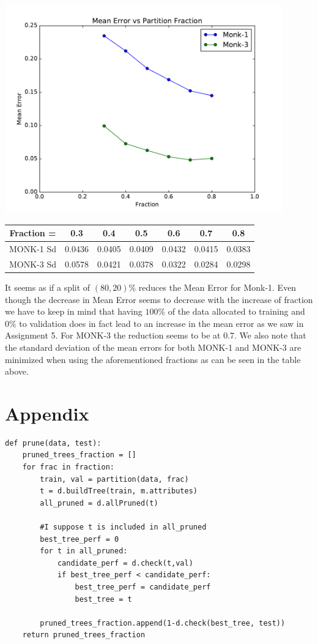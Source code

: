 \documentclass{article}
\begin{document}
\includegraphics[width = 12cm]{figure_1.pdf}

\begin{center}
 \begin{tabular}{|c c c c c c c|} 
 \hline
 Fraction = & 0.3 & 0.4 & 0.5 & 0.6 & 0.7 & 0.8  \\ [0.5ex] 
 \hline 
 MONK-1 Sd \vline & 0.0436 & 0.0405 & 0.0409 & 0.0432 & 0.0415 & 0.0383 \\ 
 \hline
 MONK-3 Sd  \vline & 0.0578 & 0.0421 & 0.0378 & 0.0322 & 0.0284 & 0.0298 \\ [1ex] 
 \hline
\end{tabular}

\end{center}

It seems as if a split of $(80,20)\%$ reduces the Mean Error for Monk-1. Even though the decrease in Mean Error seems to decrease with the increase of fraction we have to keep in mind that having $100\%$ of the data allocated to training and $0\%$ to validation does in fact lead to an increase in the mean error as we saw in Assignment 5. For MONK-3 the reduction seems to be at $0.7$. We also note that the standard deviation of the mean errors for both MONK-1 and MONK-3 are minimized when using the aforementioned fractions as can be seen in the table above.

\section*{Appendix}

\begin{lstlisting}
def prune(data, test):
	pruned_trees_fraction = []
	for frac in fraction:
		train, val = partition(data, frac)
		t = d.buildTree(train, m.attributes)
		all_pruned = d.allPruned(t)
		
		#I suppose t is included in all_pruned
		best_tree_perf = 0
		for t in all_pruned:
			candidate_perf = d.check(t,val)
			if best_tree_perf < candidate_perf:
				best_tree_perf = candidate_perf
				best_tree = t
		
		pruned_trees_fraction.append(1-d.check(best_tree, test))
	return pruned_trees_fraction
\end{lstlisting}
\end{document}
